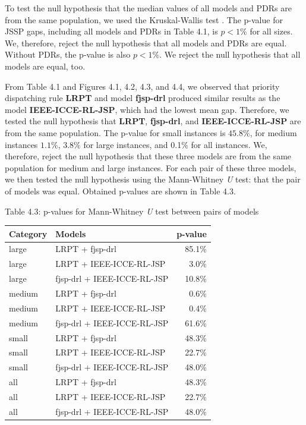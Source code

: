 To test the null hypothesis that the median values of all models and PDRs are from the same population, we used the Kruskal-Wallis test \cite{doi:10.1080/01621459.1952.10483441}. The p-value for JSSP gaps, including all models and PDRs in Table 4.1, is $p < 1\%$ for all sizes. We, therefore, reject the null hypothesis that all models and PDRs are equal. Without PDRs, the p-value is also $p < 1\%$. We reject the null hypothesis that all models are equal, too.
\par  
From Table 4.1 and Figures 4.1, 4.2, 4.3, and 4.4, we observed that priority dispatching rule \textbf{LRPT} and model \textbf{fjsp-drl} produced similar results as the model \textbf{IEEE-ICCE-RL-JSP}, which had the lowest mean gap. Therefore, we tested the null hypothesis that \textbf{LRPT}, \textbf{fjsp-drl}, and \textbf{IEEE-ICCE-RL-JSP} are from the same population. The p-value for small instances is $45.8\%$, for medium instances $1.1\%$, $3.8\%$ for large instances, and 0.1$\%$ for all instances. We, therefore, reject the null hypothesis that these three models are from the same population for medium and large instances.
For each pair of these three models, we then tested the null hypothesis using the Mann-Whitney \textit{U} test: that the pair of models was equal. Obtained p-values are shown in Table 4.3.

\begin{table}[H]
    Table 4.3: p-values for Mann-Whitney \textit{U} test between pairs of models\\
    \vspace{1mm}
    \begin{tabular}{llr}
    \toprule
    Category & Models & p-value \\
    \midrule
    large & LRPT + fjsp-drl & 85.1$\%$ \\
    large & LRPT + IEEE-ICCE-RL-JSP & 3.0$\%$ \\
    large & fjsp-drl + IEEE-ICCE-RL-JSP & 10.8$\%$ \\
    medium & LRPT + fjsp-drl & 0.6$\%$ \\
    medium & LRPT + IEEE-ICCE-RL-JSP & 0.4$\%$ \\
    medium & fjsp-drl + IEEE-ICCE-RL-JSP & 61.6$\%$ \\
    small & LRPT + fjsp-drl & 48.3$\%$ \\
    small & LRPT + IEEE-ICCE-RL-JSP & 22.7$\%$ \\
    small & fjsp-drl + IEEE-ICCE-RL-JSP & 48.0$\%$ \\
    all & LRPT + fjsp-drl & 48.3$\%$ \\
    all & LRPT + IEEE-ICCE-RL-JSP & 22.7$\%$ \\
    all & fjsp-drl + IEEE-ICCE-RL-JSP & 48.0$\%$ \\
    \bottomrule
    \end{tabular}
\end{table}

